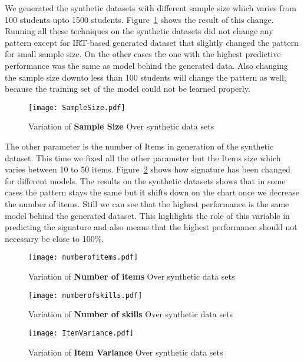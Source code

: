 We generated the synthetic datasets with different sample size which varies from 100 students upto 1500 students. Figure~\ref{figSampleSize} shows the result of this change. Running all these techniques on the synthetic datasets did not change any pattern except for IRT-based generated dataset that slightly changed the pattern for small sample size. On the other cases the one with the highest predictive performance was the same as model behind the generated data. Also changing the sample size downto less than 100 students will change the pattern as well; because the training set of the model could not be learned properly.

\begin{figure}
  \centering

    \texttt{[image: SampleSize.pdf]}
     \caption{Variation of \textbf{Sample Size} Over synthetic data sets}
\label{figSampleSize}
\end{figure}


The other parameter is the number of Items in generation of the synthetic dataset. This time we fixed all the other parameter but the Items size which varies between 10 to 50 items. Figure~\ref{figNumberofItems} shows how signature has been changed for different models. The results on the synthetic datasets shows that in some cases the pattern stays the same but it shifts down on the chart once we decrease the number of items. Still we can see that the highest performance is the same model behind the generated dataset. This highlights the role of this variable in predicting the signature and also means that the highest performance should not necessary be close to 100\%.

\begin{figure}
  \centering
    \texttt{[image: numberofitems.pdf]}
\caption{Variation of \textbf{Number of items} Over synthetic data sets}
\label{figNumberofItems}
\end{figure}

\begin{figure}
  \centering
    \texttt{[image: numberofskills.pdf]}
\caption{Variation of \textbf{Number of skills} Over synthetic data sets}
\label{figSkills}
\end{figure}

\begin{figure}
  \centering
    \texttt{[image: ItemVariance.pdf]}
\caption{Variation of \textbf{Item Variance} Over synthetic data sets}
\label{figitemVar}
\end{figure}

